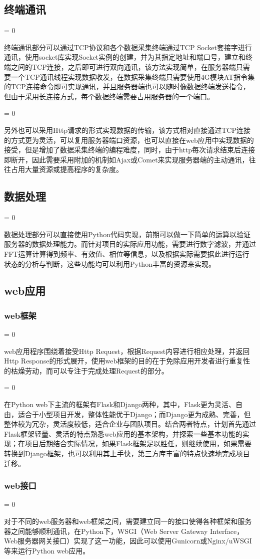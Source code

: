 \documentclass[a4paper,11pt]{ctexart}
\newcommand{\subpar}
{
	\par
	\hangafter = 0
	\setlength{\hangindent}{1em}
}
\newcommand{\subsubpar}
{
	\par
	\hangafter = 0
	\setlength{\hangindent}{2em}
}
\begin{document}
\begin{spacing}{1.5}
\subsection{终端通讯}
\subpar
终端通讯部分可以通过TCP协议和各个数据采集终端通过TCP Socket套接字进行通讯，使用socket库实现Socket实例的创建，并为其指定地址和端口号，建立和终端之间的TCP连接，之后即可进行双向通讯，该方法实现简单，在服务器端只需要一个TCP通讯线程实现数据收发，在数据采集终端只需要使用4G模块AT指令集的TCP连接命令即可实现通讯，并且服务器端也可以随时像数据终端发送指令，但由于采用长连接方式，每个数据终端需要占用服务器的一个端口。
\subpar
另外也可以采用Http请求的形式实现数据的传输，该方式相对直接通过TCP连接的方式更为灵活，可以复用服务器端口资源，也可以直接在web应用中实现数据的接受，但是增加了数据采集终端的编程难度，同时，由于http每次请求结束后连接即断开，因此需要采用附加的机制如Ajax或Comet来实现服务器端的主动通讯，往往占用大量资源或提高程序的复杂度。

\subsection{数据处理}
\subpar
数据处理部分可以直接使用Python代码实现，前期可以做一下简单的运算以验证服务器的数据处理能力。而针对项目的实际应用功能，需要进行数字滤波，并通过FFT运算计算得到频率、有效值、相位等信息，以及根据实际需要据此进行运行状态的分析与判断，这些功能均可以利用Python丰富的资源来实现。

\subsection{web应用}
\subsubsection*{web框架}
\subsubpar
web应用程序围绕着接受Http Request，根据Request内容进行相应处理，并返回Http Response的形式展开，使用web框架的目的在于免除应用开发者进行重复性的枯燥劳动，而可以专注于完成处理Request的部分。
\subsubpar
在Python web下主流的框架有Flask和Django两种，其中，Flask更为灵活、自由，适合于小型项目开发，整体性能优于Django；而Django更为成熟、完善，但整体较为冗杂，灵活度较低，适合企业与团队项目。结合两者特点，计划首先通过Flask框架轻量、灵活的特点熟悉web应用的基本架构，并探索一些基本功能的实现；在项目后期结合实际情况，如果Flask框架足以胜任，则继续使用，如果需要转换到Django框架，也可以利用其上手快，第三方库丰富的特点快速地完成项目迁移。

\subsubsection*{web接口}
\subsubpar
对于不同的web服务器和web框架之间，需要建立同一的接口使得各种框架和服务器之间能够顺利通讯，在Python下，WSGI（Web Server Gateway Interface，Web服务器网关接口）实现了这一功能，因此可以使用Gunicorn或Nginx/uWSGI等来运行Python web应用。


\end{spacing}
\end{document}
